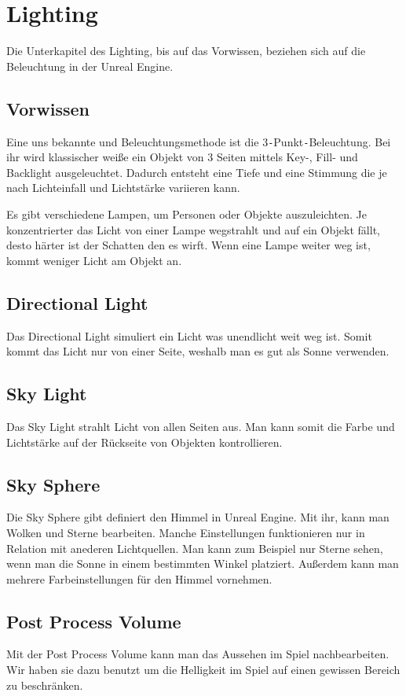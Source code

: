 \section{Lighting}
Die Unterkapitel des Lighting, bis auf das Vorwissen, beziehen sich auf die Beleuchtung in der Unreal Engine.

\subsection{Vorwissen}
Eine uns bekannte und Beleuchtungsmethode ist die 3\verb+-+Punkt\verb+-+Beleuchtung. Bei ihr wird klassischer weiße ein Objekt
von 3 Seiten mittels Key-, Fill- und Backlight ausgeleuchtet. Dadurch entsteht eine Tiefe und eine Stimmung die je nach Lichteinfall und
Lichtstärke variieren kann.

Es gibt verschiedene Lampen, um Personen oder Objekte auszuleichten. Je konzentrierter das Licht von einer Lampe wegstrahlt und auf ein Objekt
fällt, desto härter ist der Schatten den es wirft. Wenn eine Lampe weiter weg ist, kommt weniger Licht am Objekt an.

\subsection{Directional Light}
Das Directional Light simuliert ein Licht was unendlicht weit weg ist. Somit kommt das Licht nur von einer Seite, weshalb
man es gut als Sonne verwenden. \citep{unreal:directional_light}

\subsection{Sky Light}
Das Sky Light strahlt Licht von allen Seiten aus. Man kann somit die Farbe und Lichtstärke auf der Rückseite von Objekten kontrollieren.

\subsection{Sky Sphere}
Die Sky Sphere gibt definiert den Himmel in Unreal Engine. Mit ihr, kann man Wolken und Sterne bearbeiten. Manche Einstellungen funktionieren nur in Relation mit anederen
Lichtquellen. Man kann zum Beispiel nur Sterne sehen, wenn man die Sonne in einem bestimmten Winkel platziert.
Außerdem kann man mehrere Farbeinstellungen für den Himmel vornehmen.

\subsection{Post Process Volume}
Mit der Post Process Volume kann man das Aussehen im Spiel nachbearbeiten. \citep{unreal:postProcessVolume} Wir haben sie dazu benutzt um die Helligkeit im Spiel auf einen gewissen Bereich zu beschränken.


